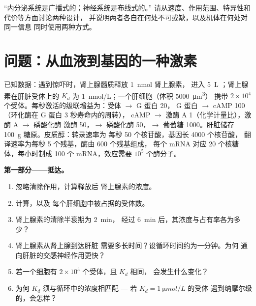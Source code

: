 \begin{exercise}[$\star\star\star$]\label{exo:b2:cell-signalling:12}
“内分泌系统是广播式的；神经系统是布线式的。”
请从速度、作用范围、特异性和代价等方面讨论两种设计，
并说明两者各自在何处不可或缺，以及机体在何处对同一信息
同时使用两种方式。
\end{exercise}

\section{问题：从血液到基因的一种激素}

\begin{problem}
\label{pb:b2:cell-signalling:1}
已知数据：遇到惊吓时，肾上腺髓质释放 \qty{1}{nmol} 肾上腺素，
进入 \qty{5}{L} ；肾上腺素在肝脏受体上的 $K_d$ 为
\qty{1}{nmol/L}；一个肝细胞（体积 \qty{5000}{\micro m^3}）
携带 $2\times 10^{4}$ 个受体。每秒激活的级联增益为：受体 $\to$ G 蛋白 20，
G 蛋白 $\to$ cAMP 100
（环化酶在 G 蛋白 3 秒寿命内的周转），
cAMP $\to$ 激酶 A 1（化学计量比），激酶 A $\to$ 磷酸化酶
激酶 50，$\to$ 磷酸化酶 50，$\to$ 葡萄糖 1000。肝脏储存
\qty{100}{g} 糖原。皮质醇：转录速率为
每秒 \qty{50}{} 个核苷酸，基因长 \qty{4000}{} 个核苷酸，
翻译速率为每秒 \qty{5}{} 个残基，酶由 \num{600} 个残基组成，
每个 mRNA 对应 \num{20} 个核糖体，每小时制成 \num{100}
个 mRNA，效应需要 $10^{5}$ 个酶分子。

\medskip
\noindent\textbf{第一部分——抵达。}
\begin{enumerate}
  \item 忽略清除作用，计算释放后
        肾上腺素的浓度。
  \item 计算，以及
        每个肝细胞中被占据的受体数。
  \item 肾上腺素的清除半衰期为 \qty{2}{min}，
        经过 \qty{6}{min} 后，其浓度与占有率各为多少？
  \item 肾上腺素从肾上腺到达肝脏
        需要多长时间？设循环时间约为一分钟。为何
        通向肝脏的交感神经作用更快？
  \item 若一个细胞有 $2\times 10^{5}$ 个受体，且 $K_d$ 相同，
        会发生什么变化？
  \item 为何 $K_d$ 须与循环中的浓度相匹配 ---
        若 $K_d = \qty{1}{\micro mol/L}$ 的受体
        遇到纳摩尔级的，会怎样？
\end{enumerate}


\end{problem}
